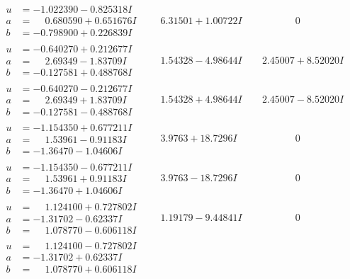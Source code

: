 \documentclass[1p]{elsarticle_modified}
\theoremstyle{definition}
\begin{document}
$$\begin{array}{c|c|c}
\begin{aligned}
u &= -1.022390 - 0.825318 I \\
a &= \phantom{-}0.680590 + 0.651676 I \\
b &= -0.798900 + 0.226839 I\end{aligned}
 & \phantom{-}6.31501 + 1.00722 I & \phantom{-0.000000 } 0 \\ \hline\begin{aligned}
u &= -0.640270 + 0.212677 I \\
a &= \phantom{-}2.69349 - 1.83709 I \\
b &= -0.127581 + 0.488768 I\end{aligned}
 & \phantom{-}1.54328 - 4.98644 I & \phantom{-}2.45007 + 8.52020 I \\ \hline\begin{aligned}
u &= -0.640270 - 0.212677 I \\
a &= \phantom{-}2.69349 + 1.83709 I \\
b &= -0.127581 - 0.488768 I\end{aligned}
 & \phantom{-}1.54328 + 4.98644 I & \phantom{-}2.45007 - 8.52020 I \\ \hline\begin{aligned}
u &= -1.154350 + 0.677211 I \\
a &= \phantom{-}1.53961 - 0.91183 I \\
b &= -1.36470 - 1.04606 I\end{aligned}
 & \phantom{-}3.9763 + 18.7296 I & \phantom{-0.000000 } 0 \\ \hline\begin{aligned}
u &= -1.154350 - 0.677211 I \\
a &= \phantom{-}1.53961 + 0.91183 I \\
b &= -1.36470 + 1.04606 I\end{aligned}
 & \phantom{-}3.9763 - 18.7296 I & \phantom{-0.000000 } 0 \\ \hline\begin{aligned}
u &= \phantom{-}1.124100 + 0.727802 I \\
a &= -1.31702 - 0.62337 I \\
b &= \phantom{-}1.078770 - 0.606118 I\end{aligned}
 & \phantom{-}1.19179 - 9.44841 I & \phantom{-0.000000 } 0 \\ \hline\begin{aligned}
u &= \phantom{-}1.124100 - 0.727802 I \\
a &= -1.31702 + 0.62337 I \\
b &= \phantom{-}1.078770 + 0.606118 I\end{aligned}

\end{array}$$
\end{document}
